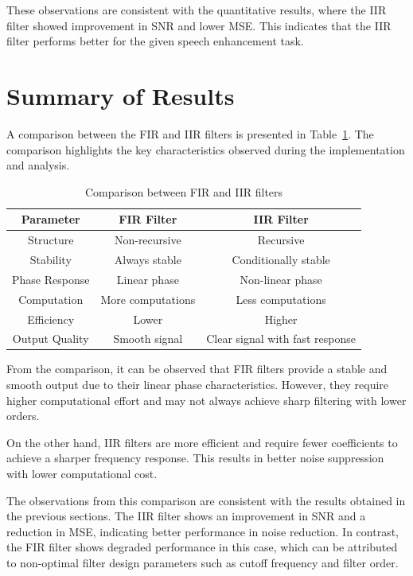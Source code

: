 \documentclass[conference]{IEEEtran}
\begin{document}
These observations are consistent with the quantitative results, where the IIR filter showed improvement in SNR and lower MSE. This indicates that the IIR filter performs better for the given speech enhancement task.

\section{Summary of Results}

A comparison between the FIR and IIR filters is presented in Table~\ref{tab:comparison}. The comparison highlights the key characteristics observed during the implementation and analysis.

\begin{table}[htbp]
\caption{Comparison between FIR and IIR filters}
\centering
\begin{tabular}{|c|c|c|}
\hline
\textbf{Parameter} & \textbf{FIR Filter} & \textbf{IIR Filter} \\
\hline
Structure & Non-recursive & Recursive \\
\hline
Stability & Always stable & Conditionally stable \\
\hline
Phase Response & Linear phase & Non-linear phase \\
\hline
Computation & More computations & Less computations \\
\hline
Efficiency & Lower & Higher \\
\hline
Output Quality & Smooth signal & Clear signal with fast response \\
\hline
\end{tabular}
\label{tab:comparison}
\end{table}

From the comparison, it can be observed that FIR filters provide a stable and smooth output due to their linear phase characteristics. However, they require higher computational effort and may not always achieve sharp filtering with lower orders.

On the other hand, IIR filters are more efficient and require fewer coefficients to achieve a sharper frequency response. This results in better noise suppression with lower computational cost.

The observations from this comparison are consistent with the results obtained in the previous sections. The IIR filter shows an improvement in SNR and a reduction in MSE, indicating better performance in noise reduction. In contrast, the FIR filter shows degraded performance in this case, which can be attributed to non-optimal filter design parameters such as cutoff frequency and filter order.
\end{document}
